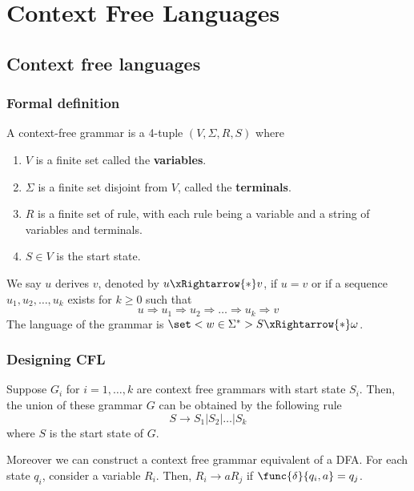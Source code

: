 \chapter{Context Free Languages}
\section{Context free languages}
\subsection{Formal definition}
\begin{definition}
    A context-free grammar is a 4-tuple \((V,\Sigma,R,S)\) where 
    \begin{enumerate}
        \item \(V\) is a finite set called the \textbf{variables}.
        \item \(\Sigma\) is a finite set disjoint from \(V\), called the \textbf{terminals}.
        \item \(R\) is a finite set of rule, with each rule being a variable and a string of variables and terminals.
        \item \(S \in V\) is the start state. 
    \end{enumerate}
\end{definition}

We say \(u\) derives \(v\), denoted by \(u \xRightarrow{\ast} v\), if \(u = v\) or if a sequence \(u_1,u_2, \dots, u_k\) exists for \(k\geq 0\) such that 
\begin{equation*}
    u \Rightarrow u_1 \Rightarrow u_2 \Rightarrow \dots \Rightarrow u_k \Rightarrow v
\end{equation*}
The language of the grammar is \(\set<w \in \Sigma^{\ast}>{S \xRightarrow{\ast} \omega }\).
\subsection{Designing CFL}
Suppose \(G_i\) for \(i=1,\dots,k\) are context free grammars with start state \(S_i\). Then, the union of these grammar \(G\) can be obtained by the following rule 
\begin{equation*}
    S \rightarrow S_1 | S_2 | \dots | S_k
\end{equation*}
where \(S\) is the start state of \(G\).

Moreover we can construct a context free grammar equivalent of a DFA. For each state \(q_i\), consider a variable \(R_i\). Then, \(R_i \rightarrow aR_j\) if \(\func{\delta}{q_i,a} = q_j\).

